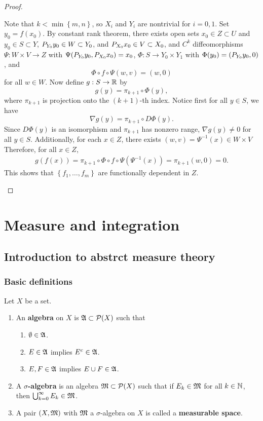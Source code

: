 \documentclass[a4paper]{article}
\renewcommand{\cupinfk}{\bigcup_{k=0}^\infty}
\begin{document}
\begin{proof}
{\begin{enumerate}
Note that $k < \min \left\{ m, n \right\}$, so $X_i$ and 
$Y_i$ are nontrivial for $i = 0, 1$.
Set $y_0 = f(x_0)$. By constant rank theorem, 
there exists open sets $x_0 \in Z \subset U$ and 
$y_0 \in S \subset Y$, ${P_{Y_0}} y_0 \in W \subset Y_0$, 
and ${P_{X_0}} x_0 \in V \subset X_0$, and $C^k$ diffeomorphisms 
$\Psi: W \times V \to Z$ with $\Psi({P_{Y_0}} y_0, {P_{X_0}} x_0) = x_0$,
$\Phi: S \to Y_0 \times Y_1$ with $\Phi(y_0) = ({P_{Y_0}} y_0, 0)$,
and 
\[
\Phi \circ f \circ \Psi(w, v) = (w, 0)
\]
for all $w \in W$. Now define $g: S \to \mathbb{R}$ 
by 
\[
g(y) = \pi_{k+1} \circ \Phi(y),
\]
where $\pi_{k+1}$ is projection onto the $(k+1)$-th index. 
Notice first for all $y \in S$, we have 
\[
\nabla g(y) = \pi_{k+1} \circ D\Phi(y).
\]
Since $D\Phi(y)$ is an isomorphism and $\pi_{k+1}$ has 
nonzero range, $\nabla g(y) \neq 0$ for all $y \in S$. 
Additionally, for each $x \in Z$, there exists $(w, v)
= \Psi^{-1}(x) \in W \times V$
Therefore, for all $x \in Z$, 
\[
\begin{aligned}
g(f(x)) = \pi_{k+1} \circ \Phi \circ f \circ \Psi(\Psi^{-1}(x)) 
= \pi_{k+1} (w, 0) = 0.
\end{aligned}
\]
This shows that $\left\{ f_1, \dots, f_m \right\}$
are functionally dependent in $Z$.
\end{enumerate}

}
\end{proof}

\section{Measure and integration}

\subsection{Introduction to abstrct measure theory}

\subsubsection{Basic definitions}

\begin{defi}
  Let $X$ be a set.
  \begin{enumerate}
    \item An \textbf{algebra} on $X$ is $\mathfrak{A} \subset
    \mathcal{P}(X)$ such that
    \begin{enumerate}
      \item $\emptyset \in \mathfrak{A}$.
      \item $E \in \mathfrak{A}$ implies $E^c \in \mathfrak{A}$.
      \item $E, F \in \mathfrak{A}$ implies $E \cup F \in \mathfrak{A}$.
    \end{enumerate}

    \item A \textbf{$\sigma$-algebra} is an algebra
    $\mathfrak{M} \subset \mathcal{P}(X)$ such that if
    $E_k \in \mathfrak{M}$ for all $k \in \mathbb{N}$, then
    $\cupinfk E_k \in \mf$.

    \item A pair $(X, \mathfrak{M})$ with $\mathfrak{M}$ a $\sigma$-algebra
    on $X$ is called a \textbf{measurable space}.
  \end{enumerate}
\end{defi}
\end{document}
